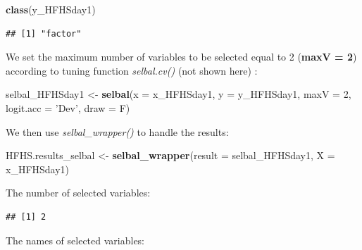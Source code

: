 \documentclass[openany]{book}
\newenvironment{Shaded}{\begin{snugshade}}{\end{snugshade}}
\newcommand{\KeywordTok}[1]{\textcolor[rgb]{0.13,0.29,0.53}{\textbf{#1}}}
\newcommand{\DataTypeTok}[1]{\textcolor[rgb]{0.13,0.29,0.53}{#1}}
\newcommand{\DecValTok}[1]{\textcolor[rgb]{0.00,0.00,0.81}{#1}}
\newcommand{\StringTok}[1]{\textcolor[rgb]{0.31,0.60,0.02}{#1}}
\newcommand{\OperatorTok}[1]{\textcolor[rgb]{0.81,0.36,0.00}{\textbf{#1}}}
\newcommand{\NormalTok}[1]{#1}
\begin{document}
\begin{Shaded}
\begin{Highlighting}[]
\KeywordTok{class}\NormalTok{(y_HFHSday1)}
\end{Highlighting}
\end{Shaded}

\begin{verbatim}
## [1] "factor"
\end{verbatim}

We set the maximum number of variables to be selected equal to 2
(\textbf{maxV = 2}) according to tuning function \emph{selbal.cv()} (not
shown here) \citep{rivera2018balances}:

\begin{Shaded}
\begin{Highlighting}[]
\NormalTok{selbal_HFHSday1 <-}\StringTok{ }\KeywordTok{selbal}\NormalTok{(}\DataTypeTok{x =}\NormalTok{ x_HFHSday1, }\DataTypeTok{y =}\NormalTok{ y_HFHSday1, }\DataTypeTok{maxV =} \DecValTok{2}\NormalTok{, }
                          \DataTypeTok{logit.acc =} \StringTok{'Dev'}\NormalTok{, }\DataTypeTok{draw =}\NormalTok{ F)}
\end{Highlighting}
\end{Shaded}

We then use \emph{selbal\_wrapper()} to handle the results:

\begin{Shaded}
\begin{Highlighting}[]
\NormalTok{HFHS.results_selbal <-}\StringTok{ }\KeywordTok{selbal_wrapper}\NormalTok{(}\DataTypeTok{result =}\NormalTok{ selbal_HFHSday1, }\DataTypeTok{X =}\NormalTok{ x_HFHSday1) }
\end{Highlighting}
\end{Shaded}

The number of selected variables:

\begin{Shaded}
\end{Shaded}

\begin{verbatim}
## [1] 2
\end{verbatim}

The names of selected variables:

\begin{Shaded}
\end{Shaded}
\end{document}

